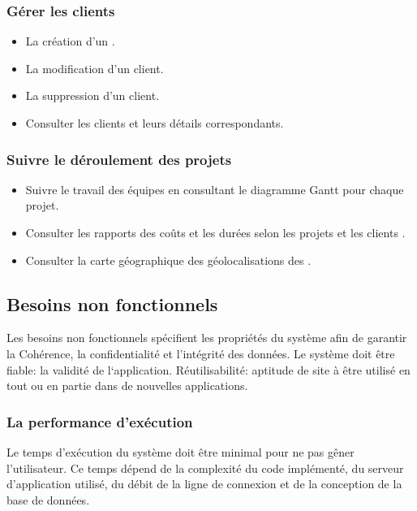 \subsubsection{G\'{e}rer les clients}

\begin{itemize}
\item{La cr\'{e}ation d'un .}
\item{La modification d'un client.}
\item{La suppression d'un client.}
\item{Consulter les clients et leurs d\'{e}tails correspondants.}
\end{itemize}

\subsubsection{
Suivre le d\'{e}roulement des projets}

\begin{itemize}
\item{ Suivre le travail des \'{e}quipes en consultant le diagramme Gantt pour chaque projet.}
\item{Consulter les rapports des co\^{u}ts et les dur\'{e}es selon les projets et les clients   .}
\item{Consulter la carte g\'{e}ographique des g\'{e}olocalisations des  .}
\end{itemize}

  \subsection{Besoins non fonctionnels}
Les besoins non fonctionnels sp\'{e}cifient les propri\'{e}t\'{e}s du syst\`{e}me afin de
garantir la Coh\'{e}rence, la confidentialit\'{e} et l'int\'{e}grit\'{e} des donn\'{e}es.
Le syst\`{e}me doit \^{e}tre fiable: la validit\'{e} de l`application.
R\'{e}utilisabilit\'{e}: aptitude de site \`{a} \^{e}tre utilis\'{e} en tout ou en partie dans de
nouvelles applications.

\subsubsection{La performance d'ex\'{e}cution}

Le temps d'ex\'{e}cution du syst\`{e}me doit \^{e}tre minimal pour ne pas g\^{e}ner
l'utilisateur. Ce temps d\'{e}pend de la complexit\'{e} du code impl\'{e}ment\'{e}, du
serveur d'application utilis\'{e}, du d\'{e}bit de la ligne de connexion et de la
conception de la base de donn\'{e}es.

